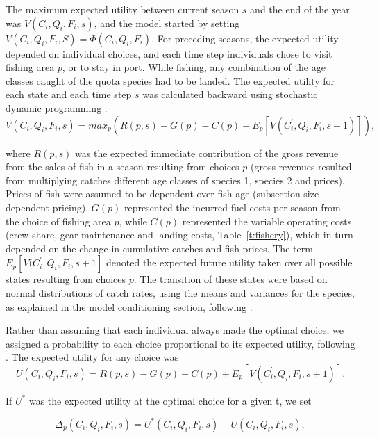 \documentclass[12pt,oneline,a4paper,numbib]{ouparticle}
\numberwithin{equation}{subsection} %
\begin{document}
The maximum expected utility between current season $s$ and the end of the year was $V (C_i, Q_i, F_i, s)$, and the model started by setting $V (C_i, Q_i, F_i, S)= \Phi (C_i, Q_i, F_i)$. For preceding seasons, the expected utility depended on individual choices, and each time step individuals chose to visit fishing area $p$, or to stay in port. While fishing, any combination of the age classes caught of the quota species had to be landed. The expected utility for each state and each time step $s$ was calculated backward using stochastic dynamic programming \cite{ClarkandMangel2000}:
\begin{equation}
V (C_i, Q_i, F_i, s) = max_{p}( R(p, s)- G(p) - C(p) + E_{p}[V (C_i^\prime, Q_i, F_i, s+1)]),
\end{equation}

where $R(p, s)$ was the expected immediate contribution of the gross revenue from the sales of fish in a season resulting from choices $p$ (gross revenues resulted from multiplying catches different age classes of species 1, species 2 and prices). Prices of fish were assumed to be dependent over fish age (subsection size dependent pricing). $G(p)$ represented the incurred fuel costs per season from the choice of fishing area $p$, while $C(p)$ represented the variable operating costs (crew share, gear maintenance and landing costs, Table~\ref{t:fishery}), which in turn depended on the change in cumulative catches and fish prices. The term $E_{p}[V (C_i^\prime, Q_i, F_i, s+1]$ denoted the expected future utility taken over all possible states resulting from choices $p$. The transition of these states were based on normal distributions of catch rates, using the means and variances for the species, as explained in the model conditioning section, following \cite{Poos2010}.

Rather than assuming that each individual always made the optimal choice, we assigned a probability to each choice proportional to its expected utility, following \cite{Dowling2011}. The expected utility for any choice was
\begin{equation}
U (C_i, Q_i, F_i, s) = R(p, s)- G(p) - C(p) + E_{p}[V (C_i^\prime, Q_i, F_i, s+1)].
\end{equation}

If $U^*$ was the expected utility at the optimal choice for a given t, we set

\begin{equation}
\Delta_{p}(C_i, Q_i, F_i, s) = U^* (C_i, Q_i, F_i, s) - U (C_i, Q_i, F_i, s),
\end{equation}
\end{document}
